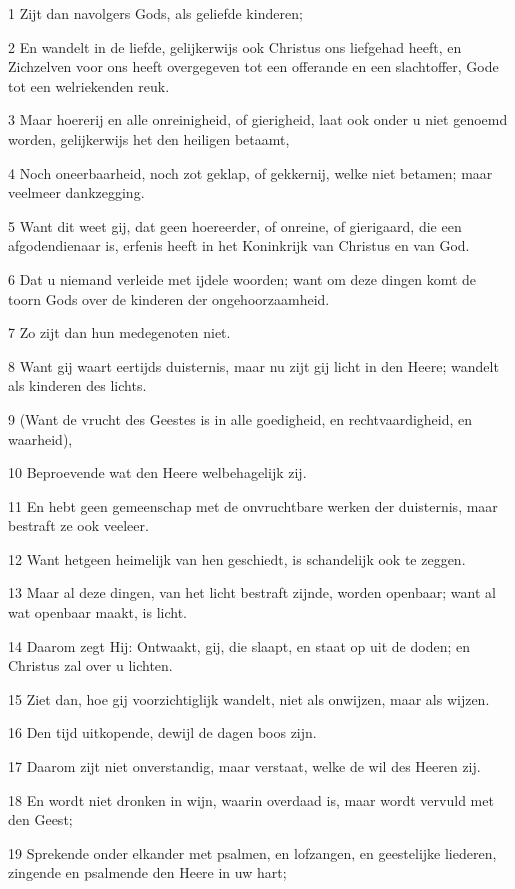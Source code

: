 \par 1 Zijt dan navolgers Gods, als geliefde kinderen;
\par 2 En wandelt in de liefde, gelijkerwijs ook Christus ons liefgehad heeft, en Zichzelven voor ons heeft overgegeven tot een offerande en een slachtoffer, Gode tot een welriekenden reuk.
\par 3 Maar hoererij en alle onreinigheid, of gierigheid, laat ook onder u niet genoemd worden, gelijkerwijs het den heiligen betaamt,
\par 4 Noch oneerbaarheid, noch zot geklap, of gekkernij, welke niet betamen; maar veelmeer dankzegging.
\par 5 Want dit weet gij, dat geen hoereerder, of onreine, of gierigaard, die een afgodendienaar is, erfenis heeft in het Koninkrijk van Christus en van God.
\par 6 Dat u niemand verleide met ijdele woorden; want om deze dingen komt de toorn Gods over de kinderen der ongehoorzaamheid.
\par 7 Zo zijt dan hun medegenoten niet.
\par 8 Want gij waart eertijds duisternis, maar nu zijt gij licht in den Heere; wandelt als kinderen des lichts.
\par 9 (Want de vrucht des Geestes is in alle goedigheid, en rechtvaardigheid, en waarheid),
\par 10 Beproevende wat den Heere welbehagelijk zij.
\par 11 En hebt geen gemeenschap met de onvruchtbare werken der duisternis, maar bestraft ze ook veeleer.
\par 12 Want hetgeen heimelijk van hen geschiedt, is schandelijk ook te zeggen.
\par 13 Maar al deze dingen, van het licht bestraft zijnde, worden openbaar; want al wat openbaar maakt, is licht.
\par 14 Daarom zegt Hij: Ontwaakt, gij, die slaapt, en staat op uit de doden; en Christus zal over u lichten.
\par 15 Ziet dan, hoe gij voorzichtiglijk wandelt, niet als onwijzen, maar als wijzen.
\par 16 Den tijd uitkopende, dewijl de dagen boos zijn.
\par 17 Daarom zijt niet onverstandig, maar verstaat, welke de wil des Heeren zij.
\par 18 En wordt niet dronken in wijn, waarin overdaad is, maar wordt vervuld met den Geest;
\par 19 Sprekende onder elkander met psalmen, en lofzangen, en geestelijke liederen, zingende en psalmende den Heere in uw hart;
